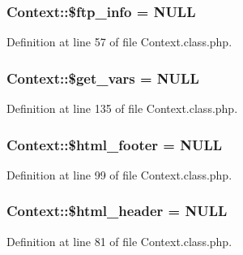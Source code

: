 \hypertarget{classContext_a8b9cb334c451f773d75db73b01f86ccc}{
\subsubsection[{\$ftp\+\_\+info}]{\setlength{\rightskip}{0pt plus 5cm}Context\+::\$ftp\+\_\+info = N\+U\+L\+L}}\label{classContext_a8b9cb334c451f773d75db73b01f86ccc}


Definition at line 57 of file Context.\+class.\+php.

\hypertarget{classContext_a587652913f4784dc8ad4a1cd4e3ee408}{
\subsubsection[{\$get\+\_\+vars}]{\setlength{\rightskip}{0pt plus 5cm}Context\+::\$get\+\_\+vars = N\+U\+L\+L}}\label{classContext_a587652913f4784dc8ad4a1cd4e3ee408}


Definition at line 135 of file Context.\+class.\+php.

\hypertarget{classContext_ad55e79b648659c59512e02a6c0d349ff}{
\subsubsection[{\$html\+\_\+footer}]{\setlength{\rightskip}{0pt plus 5cm}Context\+::\$html\+\_\+footer = N\+U\+L\+L}}\label{classContext_ad55e79b648659c59512e02a6c0d349ff}


Definition at line 99 of file Context.\+class.\+php.

\hypertarget{classContext_ab0146079ffcc658bbe5bbf4ba7b8e934}{
\subsubsection[{\$html\+\_\+header}]{\setlength{\rightskip}{0pt plus 5cm}Context\+::\$html\+\_\+header = N\+U\+L\+L}}\label{classContext_ab0146079ffcc658bbe5bbf4ba7b8e934}


Definition at line 81 of file Context.\+class.\+php.

